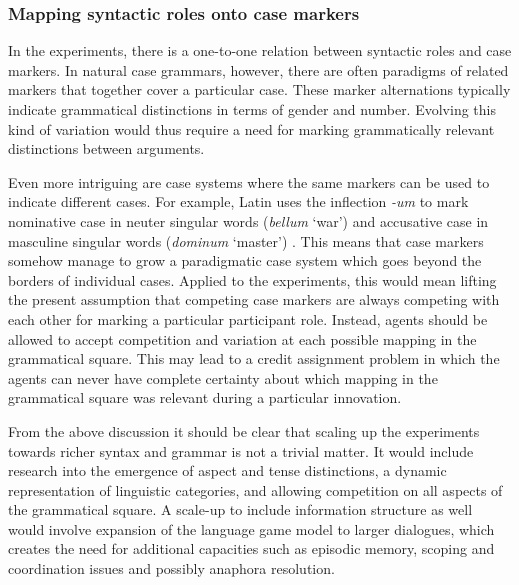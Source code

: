 \subsubsection{Mapping syntactic roles onto case markers}
 In the experiments, there is a one-to-one relation between syntactic roles and case markers. In natural case grammars, however, there are often paradigms of related markers that together cover a particular case. These marker alternations typically indicate grammatical distinctions in terms of gender and number. Evolving this kind of variation would thus require a need for marking grammatically relevant distinctions between arguments.

Even more intriguing are case systems where the same markers can be used to indicate different cases. For example, Latin uses the inflection {\em -um} to mark nominative case in neuter singular words ({\em bellum} `war') and accusative case in masculine singular words ({\em dominum} `master') \citep[4--5]{blake94case}. This means that case markers somehow manage to grow a paradigmatic case system which goes beyond the borders of individual cases. Applied to the experiments, this would mean lifting the present assumption that competing case markers are always competing with each other for marking a particular participant role. Instead, agents should be allowed to accept competition and variation at each possible mapping in the grammatical square. This may lead to a credit assignment problem in which the agents can never have complete certainty about which mapping in the grammatical square was relevant during a particular innovation.

From the above discussion it should be clear that scaling up the experiments towards richer syntax and grammar is not a trivial matter. It would include research into the emergence of aspect and tense distinctions, a dynamic representation of linguistic categories, and allowing competition on all aspects of the grammatical square. A scale-up to include information structure as well would involve expansion of the language game model to larger dialogues, which creates the need for additional capacities such as episodic memory, scoping and coordination issues and possibly anaphora resolution.